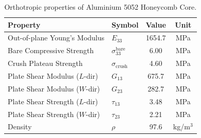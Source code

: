\documentclass[11pt,a4paper]{article}
\begin{document}
\begin{table}[htbp]
\centering
\caption{Orthotropic properties of Aluminium 5052 Honeycomb Core.}
\label{tab:honeycomb}
\begin{tabular}{@{}llcc@{}}
\toprule
\textbf{Property} & \textbf{Symbol} & \textbf{Value} & \textbf{Unit} \\
\midrule
Out-of-plane Young's Modulus & $E_{33}$ & 1654.7 & MPa \\
Bare Compressive Strength & $\sigma_{33}^{\text{bare}}$ & 6.00 & MPa \\
Crush Plateau Strength & $\sigma_{\text{crush}}$ & 4.60 & MPa \\
Plate Shear Modulus ($L$-dir) & $G_{13}$ & 675.7 & MPa \\
Plate Shear Modulus ($W$-dir) & $G_{23}$ & 282.7 & MPa \\
Plate Shear Strength ($L$-dir) & $\tau_{13}$ & 3.48 & MPa \\
Plate Shear Strength ($W$-dir) & $\tau_{23}$ & 2.21 & MPa \\
Density & $\rho$ & 97.6 & kg/m$^3$ \\
\bottomrule
\end{tabular}
\end{table}
\end{document}
